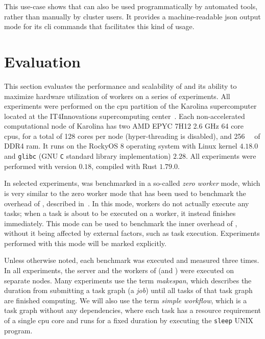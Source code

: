 This use-case shows that \hyperqueue{} can also be used programmatically by automated
tools, rather than manually by cluster users. It provides a machine-readable
\gls{json} output mode for its \gls{cli} commands that facilitates this
kind of usage.

\section{Evaluation}
\label{hq:evaluation}
This section evaluates the performance and scalability of \hyperqueue{} and its ability to
maximize hardware utilization of workers on a series of experiments. All experiments were performed
on the \gls{cpu} partition of the Karolina supercomputer~\cite{karolina}
located at the IT4Innovations supercomputing center~\cite{it4i}. Each non-accelerated
computational node of Karolina has two AMD EPYC\texttrademark{} 7H12 2.6 GHz 64 core
\glspl{cpu}, for a total of 128 cores per node (hyper-threading is disabled), and
\SI{256}{\gibi\byte} of DDR4 \gls{ram}. It runs on the RockyOS 8 operating system
with Linux kernel $4.18.0$ and \texttt{glibc} (GNU \texttt{C} standard library implementation) $2.28$. All
experiments were performed with \hyperqueue{} version $0.18$, compiled with
Rust $1.79.0$.

In selected experiments, \hq{} was benchmarked in a so-called
\emph{zero worker} mode, which is very similar to the zero worker mode that has been used to
benchmark the overhead of \rsds{}, described in~. In this
mode, workers do not actually execute any tasks; when a task is about to be executed on a worker,
it instead finishes immediately. This mode can be used to benchmark the inner overhead of
\hyperqueue{}, without it being affected by external factors, such as task execution.
Experiments performed with this mode will be marked explicitly.

Unless otherwise noted, each benchmark was executed and measured three times. In all experiments,
the server and the workers of \hyperqueue{} (and \dask{}) were executed on separate nodes. Many
experiments use the term \emph{makespan}, which describes the duration from submitting a
task graph (a \hyperqueue{} \emph{job}) until all tasks of that task graph are
finished computing. We will also use the term \emph{simple workflow}, which is a task graph without
any dependencies, where each task has a resource requirement of a single \gls{cpu}
core and runs for a fixed duration by executing the \texttt{sleep} UNIX program.

